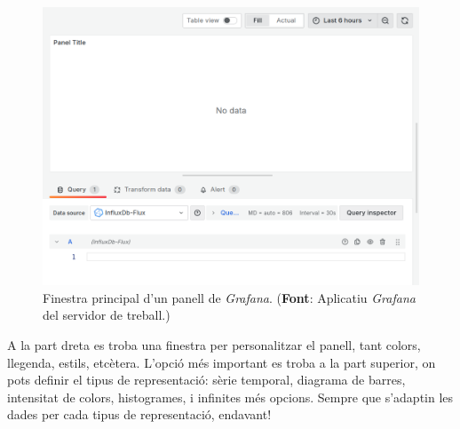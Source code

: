 \begin{figure}[htbp]
    \centerline{\includegraphics[width=\textwidth]{figures/grafana-main-panel}}
    \captionsetup{justification=centering}
    \caption[Finestra principal d'un panell de \textit{Grafana}.]{Finestra principal d'un panell de \textit{Grafana}. (\textbf{Font}: Aplicatiu \textit{Grafana} del servidor de treball.)}\label{fig:grafana-main-panel}
\end{figure}

\clearpage

\noindent
A la part dreta es troba una finestra per personalitzar el panell, tant colors, llegenda, estils, etcètera.
L’opció més important es troba a la part superior, on pots definir el tipus de representació: sèrie temporal, diagrama de barres, intensitat de colors, histogrames, i infinites més opcions.
Sempre que s’adaptin les dades per cada tipus de representació, endavant!

